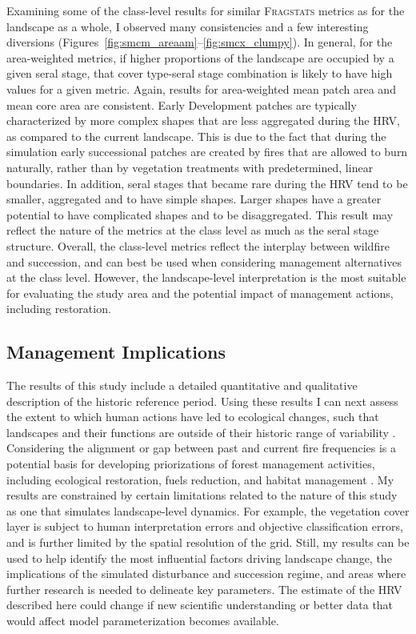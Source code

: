 Examining some of the class-level results for similar \textsc{Fragstats} metrics as for the landscape as a whole, I observed many consistencies and a few interesting diversions (Figures~\ref{fig:smcm_areaam}--\ref{fig:smcx_clumpy}). In general, for the area-weighted metrics, if higher proportions of the landscape are occupied by a given seral stage, that cover type-seral stage combination is likely to have high values for a given metric. Again, results for area-weighted mean patch area and mean core area are consistent. Early Development patches are typically characterized by more complex shapes that are less aggregated during the HRV, as compared to the current landscape. This is due to the fact that during the simulation early successional patches are created by fires that are allowed to burn naturally, rather than by vegetation treatments with predetermined, linear boundaries. In addition, seral stages that became rare during the HRV tend to be smaller, aggregated and to have simple shapes. Larger shapes have a greater potential to have complicated shapes and to be disaggregated. This result may reflect the nature of the metrics at the class level as much as the seral stage structure. Overall, the class-level metrics reflect the interplay between wildfire and succession, and can best be used when considering management alternatives at the class level. However, the landscape-level interpretation is the most suitable for evaluating the study area and the potential impact of management actions, including restoration. 

\clearpage



\clearpage
\subsection{Management Implications}

The results of this study include a detailed quantitative and qualitative description of the historic reference period. Using these results I can next assess the extent to which human actions have led to ecological changes, such that landscapes and their functions are outside of their historic range of variability \citep{Landres1999,Swetnam1999}. Considering the alignment or gap between past and current fire frequencies is a potential basis for developing priorizations of forest management activities, including ecological restoration, fuels reduction, and habitat management \cite{Fule2008,Safford2014}. My results are constrained by certain limitations related to the nature of this study as one that simulates landscape-level dynamics. For example, the vegetation cover layer is subject to human interpretation errors and objective classification errors, and is further limited by the spatial resolution of the grid. Still, my results can be used to help identify the most influential factors driving landscape change, the implications of the simulated disturbance and succession regime, and areas where further research is needed to delineate key parameters. The estimate of the HRV described here could change if new scientific understanding or better data that would affect model parameterization becomes available.

